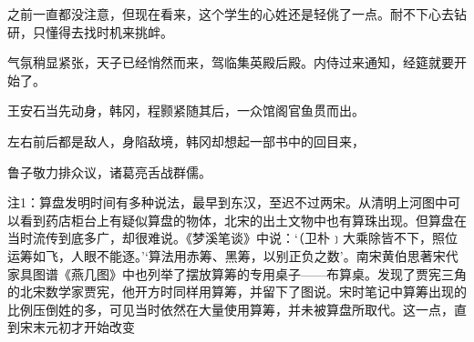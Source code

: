 之前一直都没注意，但现在看来，这个学生的心姓还是轻佻了一点。耐不下心去钻研，只懂得去找时机来挑衅。

气氛稍显紧张，天子已经悄然而来，驾临集英殿后殿。内侍过来通知，经筵就要开始了。

王安石当先动身，韩冈，程颢紧随其后，一众馆阁官鱼贯而出。

左右前后都是敌人，身陷敌境，韩冈却想起一部书中的回目来，

鲁子敬力排众议，诸葛亮舌战群儒。

注1：算盘发明时间有多种说法，最早到东汉，至迟不过两宋。从清明上河图中可以看到药店柜台上有疑似算盘的物体，北宋的出土文物中也有算珠出现。但算盘在当时流传到底多广，却很难说。《梦溪笔谈》中说：‘（卫朴﹞大乘除皆不下，照位运筹如飞，人眼不能逐。’‘算法用赤筹、黑筹，以别正负之数’。南宋黄伯思著宋代家具图谱《燕几图》中也列举了摆放算筹的专用桌子——布算桌。发现了贾宪三角的北宋数学家贾宪，他开方时同样用算筹，并留下了图说。宋时笔记中算筹出现的比例压倒姓的多，可见当时依然在大量使用算筹，并未被算盘所取代。这一点，直到宋末元初才开始改变

